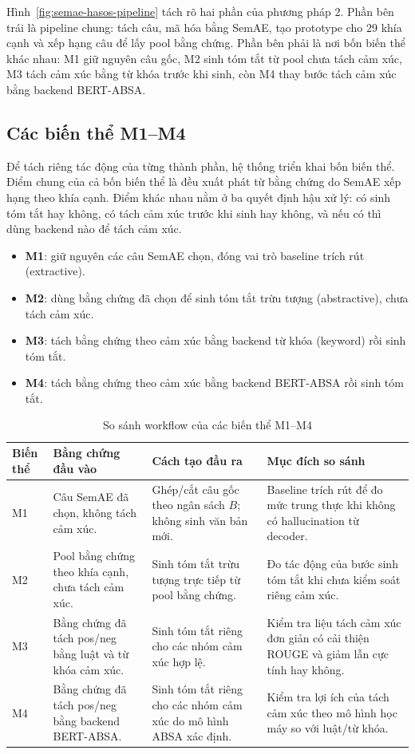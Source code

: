 \documentclass[12pt,a4paper]{report}
\begin{document}
Hình~\ref{fig:semae-hasos-pipeline} tách rõ hai phần của phương pháp 2. Phần bên trái là pipeline chung: tách câu, mã hóa bằng SemAE, tạo prototype cho 29 khía cạnh và xếp hạng câu để lấy pool bằng chứng. Phần bên phải là nơi bốn biến thể khác nhau: M1 giữ nguyên câu gốc, M2 sinh tóm tắt từ pool chưa tách cảm xúc, M3 tách cảm xúc bằng từ khóa trước khi sinh, còn M4 thay bước tách cảm xúc bằng backend BERT-ABSA.

\subsection{Các biến thể M1--M4}

Để tách riêng tác động của từng thành phần, hệ thống triển khai bốn biến thể. Điểm chung của cả bốn biến thể là đều xuất phát từ bằng chứng do SemAE xếp hạng theo khía cạnh. Điểm khác nhau nằm ở ba quyết định hậu xử lý: có sinh tóm tắt hay không, có tách cảm xúc trước khi sinh hay không, và nếu có thì dùng backend nào để tách cảm xúc.

\begin{itemize}[leftmargin=1.2cm]
    \item \textbf{M1}: giữ nguyên các câu SemAE chọn, đóng vai trò baseline trích rút (extractive).
    \item \textbf{M2}: dùng bằng chứng đã chọn để sinh tóm tắt trừu tượng (abstractive), chưa tách cảm xúc.
    \item \textbf{M3}: tách bằng chứng theo cảm xúc bằng backend từ khóa (keyword) rồi sinh tóm tắt.
    \item \textbf{M4}: tách bằng chứng theo cảm xúc bằng backend BERT-ABSA rồi sinh tóm tắt.
\end{itemize}

\begin{table}[tbp]
\centering
\caption{So sánh workflow của các biến thể M1--M4}
\label{tab:m1-m4-workflow}
\small
\begin{tabularx}{\textwidth}{l L{0.24\textwidth} L{0.23\textwidth} Y}
\toprule
\textbf{Biến thể} & \textbf{Bằng chứng đầu vào} & \textbf{Cách tạo đầu ra} & \textbf{Mục đích so sánh} \\
\midrule
M1 & Câu SemAE đã chọn, không tách cảm xúc. & Ghép/cắt câu gốc theo ngân sách $B$; không sinh văn bản mới. & Baseline trích rút để đo mức trung thực khi không có hallucination từ decoder. \\
M2 & Pool bằng chứng theo khía cạnh, chưa tách cảm xúc. & Sinh tóm tắt trừu tượng trực tiếp từ pool bằng chứng. & Đo tác động của bước sinh tóm tắt khi chưa kiểm soát riêng cảm xúc. \\
M3 & Bằng chứng đã tách pos/neg bằng luật và từ khóa cảm xúc. & Sinh tóm tắt riêng cho các nhóm cảm xúc hợp lệ. & Kiểm tra liệu tách cảm xúc đơn giản có cải thiện ROUGE và giảm lẫn cực tính hay không. \\
M4 & Bằng chứng đã tách pos/neg bằng backend BERT-ABSA. & Sinh tóm tắt riêng cho các nhóm cảm xúc do mô hình ABSA xác định. & Kiểm tra lợi ích của tách cảm xúc theo mô hình học máy so với luật/từ khóa. \\
\bottomrule
\end{tabularx}
\end{table}
\end{document}
